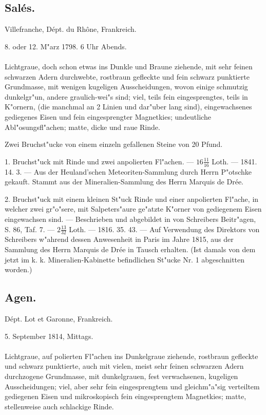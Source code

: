 \documentclass[a4paper, 11pt, oneside, polutonikogreek, german]{article}
\begin{document}
\subsection{Salés.}
\begin{center}
\small
Villefranche, Dépt. du Rhône, Frankreich.

8. oder 12. M"arz 1798. 6 Uhr Abends.
\end{center}
\paragraph{}
Lichtgraue, doch schon etwas ins Dunkle und Braune ziehende, mit sehr feinen schwarzen Adern durchwebte, rostbraun gefleckte und fein schwarz punktierte Grundmasse, mit wenigen kugeligen Ausscheidungen, wovon einige schmutzig dunkelgr"un, andere graulich-wei"s sind; viel, teils fein eingesprengtes, teils in K"ornern, (die manchmal an 2 Linien und dar"uber lang sind), eingewachsenes gediegenes Eisen und fein eingesprengter Magnetkies; undeutliche Abl"osungsfl"achen; matte, dicke und raue Rinde.

Zwei Bruchst"ucke von einem einzeln gefallenen Steine von 20 Pfund.

1. Bruchst"uck mit Rinde und zwei anpolierten Fl"achen. --- $16\frac{11}{16}$ Loth. --- 1841. 14. 3. --- Aus der Heuland'schen Meteoriten-Sammlung durch Herrn P"otschke gekauft. Stammt aus der Mineralien-Sammlung des Herrn Marquis de Drée.

2. Bruchst"uck mit einem kleinen St"uck Rinde und einer anpolierten Fl"ache, in welcher zwei gr"o"sere, mit Salpeters"aure ge"atzte K"orner von gediegenem Eisen eingewachsen sind. --- Beschrieben und abgebildet in von Schreibers Beitr"agen, S. 86, Taf. 7. --- $2\frac{13}{32}$ Loth. --- 1816. 35. 43. --- Auf Verwendung des Direktors von Schreibers w"ahrend dessen Anwesenheit in Paris im Jahre 1815, aus der Sammlung des Herrn Marquis de Drée in Tausch erhalten. (Ist damals von dem jetzt im k. k. Mineralien-Kabinette befindlichen St"ucke Nr. 1 abgeschnitten worden.)
\subsection{Agen.}
\begin{center}
\small
Dépt. Lot et Garonne, Frankreich.

5. September 1814, Mittags.
\end{center}
\paragraph{}
Lichtgraue, auf polierten Fl"achen ins Dunkelgraue ziehende, rostbraun gefleckte und schwarz punktierte, auch mit vielen, meist sehr feinen schwarzen Adern durchzogene Grundmasse, mit dunkelgrauen, fest verwachsenen, kugeligen Ausscheidungen; viel, aber sehr fein eingesprengtem und gleichm"a"sig verteiltem gediegenen Eisen und mikroskopisch fein eingesprengtem Magnetkies; matte, stellenweise auch schlackige Rinde.
\end{document}
